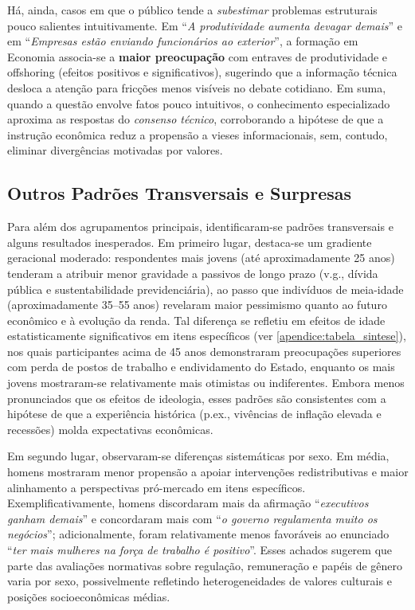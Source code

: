 Há, ainda, casos em que o público tende a \textit{subestimar} problemas estruturais pouco salientes intuitivamente. Em ``\textit{A produtividade aumenta devagar demais}'' e em ``\textit{Empresas estão enviando funcionários ao exterior}'', a formação em Economia associa-se a \textbf{maior preocupação} com entraves de produtividade e offshoring (efeitos positivos e significativos), sugerindo que a informação técnica desloca a atenção para fricções menos visíveis no debate cotidiano. Em suma, quando a questão envolve fatos pouco intuitivos, o conhecimento especializado aproxima as respostas do \textit{consenso técnico}, corroborando a hipótese de que a instrução econômica reduz a propensão a vieses informacionais, sem, contudo, eliminar divergências motivadas por valores.

\subsection{Outros Padrões Transversais e Surpresas}
Para além dos agrupamentos principais, identificaram-se padrões transversais e alguns resultados inesperados. Em primeiro lugar, destaca-se um gradiente geracional moderado: respondentes mais jovens (até aproximadamente 25 anos) tenderam a atribuir menor gravidade a passivos de longo prazo (v.g., dívida pública e sustentabilidade previdenciária), ao passo que indivíduos de meia-idade (aproximadamente 35--55 anos) revelaram maior pessimismo quanto ao futuro econômico e à evolução da renda. Tal diferença se refletiu em efeitos de idade estatisticamente significativos em itens específicos (ver \autoref{apendice:tabela_sintese}), nos quais participantes acima de 45 anos demonstraram preocupações superiores com perda de postos de trabalho e endividamento do Estado, enquanto os mais jovens mostraram-se relativamente mais otimistas ou indiferentes. Embora menos pronunciados que os efeitos de ideologia, esses padrões são consistentes com a hipótese de que a experiência histórica (p.ex., vivências de inflação elevada e recessões) molda expectativas econômicas.

Em segundo lugar, observaram-se diferenças sistemáticas por sexo. Em média, homens mostraram menor propensão a apoiar intervenções redistributivas e maior alinhamento a perspectivas pró-mercado em itens específicos. Exemplificativamente, homens discordaram mais da afirmação ``\textit{executivos ganham demais}'' e concordaram mais com ``\textit{o governo regulamenta muito os negócios}''; adicionalmente, foram relativamente menos favoráveis ao enunciado ``\textit{ter mais mulheres na força de trabalho é positivo}''. Esses achados sugerem que parte das avaliações normativas sobre regulação, remuneração e papéis de gênero varia por sexo, possivelmente refletindo heterogeneidades de valores culturais e posições socioeconômicas médias.

